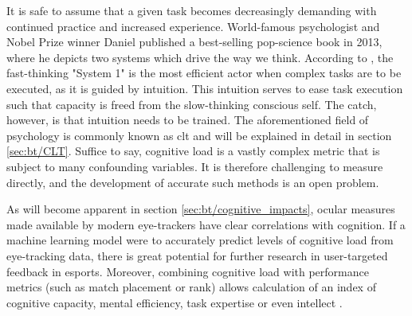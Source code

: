 It is safe to assume that a given task becomes decreasingly demanding with continued practice and increased experience. World-famous psychologist and Nobel Prize winner Daniel \textcite{kahneman2013} published a best-selling pop-science book in 2013, where he depicts two systems which drive the way we think. According to \textcite{kahneman2013}, the fast-thinking "System 1" is the most efficient actor when complex tasks are to be executed, as it is guided by intuition. 
This intuition serves to ease task execution such that capacity is freed from the slow-thinking conscious self. The catch, however, is that intuition needs to be trained. The aforementioned field of psychology is commonly known as \acrfull{clt} and will be explained in detail in section \ref{sec:bt/CLT}. Suffice to say, cognitive load is a vastly complex metric that is subject to many confounding variables. It is therefore challenging to measure directly, and the development of accurate such methods is an open problem.


As will become apparent in section \ref{sec:bt/cognitive_impacts}, ocular measures made available by modern eye-trackers have clear correlations with cognition. If a machine learning model were to accurately predict levels of cognitive load from eye-tracking data, there is great potential for further research in user-targeted feedback in esports. Moreover, combining cognitive load with performance metrics (such as match placement or rank) allows calculation of an index of cognitive capacity, mental efficiency, task expertise or even intellect \cite{sweller1998}.


